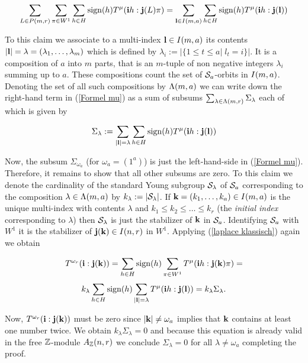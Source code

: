\documentclass[twoside,12pt]{article}
\begin{document}
\begin{Pf}
\begin{equation} \label{Formel mu}
\sum_{L \in P({m},{r})}\sum_{\pi \in W^1}\sum_{h \in H} {\rm sign}(h) 
T^{\mu}({\bf i}h:{\bf j}(L)\pi)=
\sum_{{\bf l} \in I(m,a)}
\sum_{h \in H}{\rm sign}(h)T^{\mu}({\bf i}h:{\bf j}({\bf l}))
\end{equation}

To this claim we associate to a multi-index ${\bf l}\in I(m,a)$ its
contents $|{\bf l}|=\lambda =(\lambda_1,\ldots , \lambda_m)$
which is defined by $\lambda_i:=|\{1\leq t \leq a|\; l_t=i\}|$. It is
a composition of $a$ into $m$ parts, that is an $m$-tuple of non negative
integers $\lambda_i$ summing up to $a$. These compositions count the
set of ${\cal S}_{a}$-orbits in $I(m,a)$.
Denoting the set of all such
compositions by $\Lambda(m, a)$ we can write down the right-hand term in
(\ref{Formel mu}) as a sum of subsums
$\sum_{\lambda \in \Lambda(m, r)} \Sigma_{\lambda}$ each of which is given by

\[ \Sigma_{\lambda}:=\sum_{|{\bf l}|=\lambda}
\sum_{h \in H} {\rm sign}(h)
T^{\mu}({\bf i}h:{\bf j}({\bf l}))
\]

Now, the subsum $\Sigma_{\omega_a}$ (for $\omega_a=(1^a)$)
is just the left-hand-side in
(\ref{Formel mu}). Therefore, it remains to show that all other
subsums are zero. To this claim we denote the cardinality 
of the standard Young subgroup ${\cal S}_{\lambda}$ of ${\cal S}_{a}$
corresponding to the composition $\lambda \in \Lambda(m, a)$
by $k_{\lambda}:=|{\cal S}_{\lambda}|$. If
${\bf k}=(k_1, \ldots ,k_a)\in I(m,a)$ is the unique multi-index
with contents $\lambda$ and $k_1\leq
k_2\leq \ldots \leq k_r$ (the {\em initial index} corresponding to $\lambda$)
then ${\cal S}_{\lambda}$ is just the stabilizer of
${\bf k}$ in ${\cal S}_{a}$. Identifying ${\cal S}_{a}$ with $W^1$ it is the stabilizer of
${\bf j}({\bf k})\in I(n,r)$ in $W^1$.
Applying (\ref{laplace klassisch}) again we obtain

\[ T^{\omega_r}({\bf i}:{\bf j}({\bf k}))=\sum_{h\in H}{\rm sign}(h)
\sum_{\pi \in W^1}
T^{\mu}({\bf i}h:{\bf j}({\bf k})\pi)= \]
\[
k_{\lambda}\sum_{h\in H}{\rm sign}(h)
\sum_{|{\bf l}|=\lambda}
T^{\mu}({\bf i}h:{\bf j}({\bf l}))=
 k_{\lambda}\Sigma_{\lambda}.
\]

Now, $T^{\omega_r}({\bf i}:{\bf j}({\bf k}))$ must be zero since 
$|{\bf k}|\neq \omega_a$ implies that ${\bf k}$ contains at least one
number twice. We obtain $k_{\lambda}\Sigma_{\lambda}=0$ and because
this equation is already valid in the free ${\mathbb Z}$-module $A_{{\mathbb Z}}(n,r)$
we conclude $\Sigma_{\lambda}=0$ for all $\lambda \neq \omega_a$
completing the proof.
\end{Pf}
\end{document}
